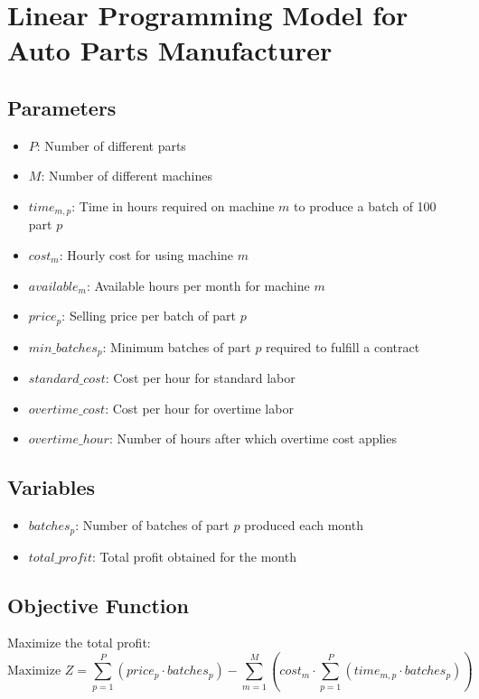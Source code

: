 \documentclass{article}
\begin{document}
\section*{Linear Programming Model for Auto Parts Manufacturer}

\subsection*{Parameters}
\begin{itemize}
    \item $P$: Number of different parts
    \item $M$: Number of different machines
    \item $time_{m,p}$: Time in hours required on machine $m$ to produce a batch of 100 part $p$
    \item $cost_{m}$: Hourly cost for using machine $m$
    \item $available_{m}$: Available hours per month for machine $m$
    \item $price_{p}$: Selling price per batch of part $p$
    \item $min\_batches_{p}$: Minimum batches of part $p$ required to fulfill a contract
    \item $standard\_cost$: Cost per hour for standard labor
    \item $overtime\_cost$: Cost per hour for overtime labor
    \item $overtime\_hour$: Number of hours after which overtime cost applies
\end{itemize}

\subsection*{Variables}
\begin{itemize}
    \item $batches_{p}$: Number of batches of part $p$ produced each month
    \item $total\_profit$: Total profit obtained for the month
\end{itemize}

\subsection*{Objective Function}
Maximize the total profit:
\[
\text{Maximize } Z = \sum_{p=1}^{P} (price_{p} \cdot batches_{p}) - \sum_{m=1}^{M} (cost_{m} \cdot \sum_{p=1}^{P} (time_{m,p} \cdot batches_{p}))
\]
\end{document}
